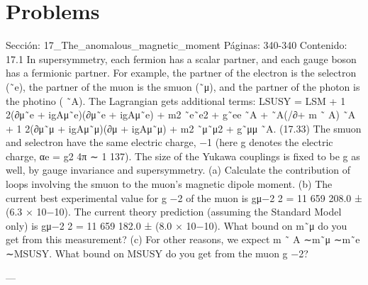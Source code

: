 \section*{Problems}
Sección: 17_The_anomalous_magnetic_moment
Páginas: 340-340
Contenido:
17.1 In supersymmetry, each fermion has a scalar partner, and each gauge boson has a
fermionic partner. For example, the partner of the electron is the selectron (˜e), the
partner of the muon is the smuon (˜μ), and the partner of the photon is the photino
( ˜A). The Lagrangian gets additional terms:
LSUSY = LSM + 1
2(∂μ˜e + igAμ˜e)(∂μ˜e + igAμ˜e) + m2
˜e˜e2 + g˜ee ˜A
+ ˜A(/∂+ m ˜
A) ˜A + 1
2(∂μ˜μ + igAμ˜μ)(∂μ + igAμ˜μ) + m2
˜μ˜μ2 + g˜μμ ˜A.
(17.33)
The smuon and selectron have the same electric charge, −1 (here g denotes the
electric charge, αe = g2
4π ∼
1
137). The size of the Yukawa couplings is ﬁxed to be g
as well, by gauge invariance and supersymmetry.
(a) Calculate the contribution of loops involving the smuon to the muon’s magnetic
dipole moment.
(b) The current best experimental value for g −2 of the muon is
gμ−2
2
=
11 659 208.0 ± (6.3 × 10−10). The current theory prediction (assuming the
Standard Model only) is gμ−2
2
= 11 659 182.0 ± (8.0 × 10−10). What bound on
m˜μ do you get from this measurement?
(c) For other reasons, we expect m ˜
A ∼m˜μ ∼m˜e ∼MSUSY. What bound on
MSUSY do you get from the muon g −2?


---


